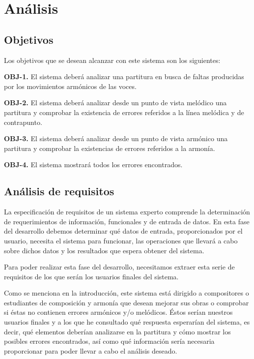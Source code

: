 \chapter{Análisis}

\section{Objetivos}

Los objetivos que se desean alcanzar con este sistema son los siguientes:

\bigskip
\textbf{OBJ-1.} El sistema deberá analizar una partitura en busca de faltas producidas por los movimientos armónicos de las voces.

\textbf{OBJ-2.} El sistema deberá analizar desde un punto de vista melódico una partitura y comprobar la existencia de errores referidos a la línea melódica y de contrapunto.

\textbf{OBJ-3.} El sistema deberá analizar desde un punto de vista armónico una partitura y comprobar la existencias de errores referidos a la armonía.

\textbf{OBJ-4.} El sistema mostrará todos los errores encontrados. 

\section{Análisis de requisitos}

La especificación de requisitos de un sistema experto comprende la determinación de requerimientos de información, funcionales y de entrada de datos. En esta fase del desarrollo debemos determinar qué datos de entrada, proporcionados por el usuario, necesita el sistema para funcionar, las operaciones que llevará a cabo sobre dichos datos y los resultados que espera obtener del sistema.  

Para poder realizar esta fase del desarrollo, necesitamos extraer esta serie de requisitos de los que serán los usuarios finales del sistema.

Como se menciona en la introducción, este sistema está dirigido a compositores o estudiantes de composición y armonía que desean mejorar sus obras o comprobar si éstas no contienen errores armónicos y/o melódicos. Éstos serían nuestros usuarios finales y a los que he consultado qué respuesta esperarían del sistema, es decir, qué elementos deberían analizarse en la partitura y cómo mostrar los posibles errores encontrados, así como qué información sería necesaria proporcionar para poder llevar a cabo el análisis deseado. 

